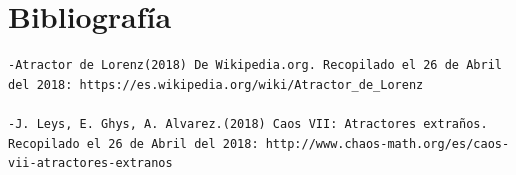 \documentclass[12pt]{article}
\begin{document}
\section{Bibliografía}

\begin{verbatim}
-Atractor de Lorenz(2018) De Wikipedia.org. Recopilado el 26 de Abril del 2018: https://es.wikipedia.org/wiki/Atractor_de_Lorenz

-J. Leys, E. Ghys, A. Alvarez.(2018) Caos VII: Atractores extraños. Recopilado el 26 de Abril del 2018: http://www.chaos-math.org/es/caos-vii-atractores-extranos


\end{verbatim}
\end{document}
